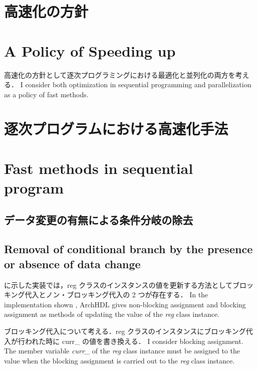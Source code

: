 \section{高速化の方針}
\fi
\section{A Policy of Speeding up}

高速化の方針として逐次プログラミングにおける最適化と並列化の両方を考える．
\fi
I consider both optimization in sequential programming and parallelization
as a policy of fast methods.

\section{逐次プログラムにおける高速化手法}
\fi
\section{Fast methods in sequential program}

\subsection{データ変更の有無による条件分岐の除去 \label{sss:no_set}}
\fi

\subsection{Removal of conditional branch by the presence or absence of data change}
\label{sss:no_set}

 に示した実装では，reg クラスのインスタンスの値を更新する方法としてブロッキング代入とノン・ブロッキング代入の 2 つが存在する．
\fi
In the implementation shown ,
ArchHDL gives non-blocking assignment and blocking assignment as methods of updating the value of the \textit{reg} class instance.

ブロッキング代入について考える．reg クラスのインスタンスにブロッキング代入が行われた時に curr\_ の値を書き換える．
\fi
I consider blocking assignment.
The member variable \textit{curr\_} of the \textit{reg} class instance must be assigned to the value
when the blocking assignment is carried out to the \textit{reg} class instance.

